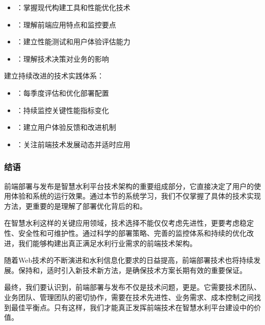 \begin{itemize}
\tightlist
\item
  ：掌握现代构建工具和性能优化技术
\item
  ：理解前端应用特点和监控要点\\
\item
  ：建立性能测试和用户体验评估能力
\item
  ：理解技术决策对业务的影响
\end{itemize}


建立持续改进的技术实践体系：

\begin{itemize}
\tightlist
\item
  ：每季度评估和优化部署配置
\item
  ：持续监控关键性能指标变化
\item
  ：建立用户体验反馈和改进机制
\item
  ：关注前端技术发展动态并适时应用
\end{itemize}

\hypertarget{ux7ed3ux8bed-1}{%
\subsubsection{结语}\label{ux7ed3ux8bed-1}}

前端部署与发布是智慧水利平台技术架构的重要组成部分，它直接决定了用户的使用体验和系统的运行效果。通过本节的系统学习，我们不仅掌握了具体的技术实现方法，更重要的是理解了部署优化背后的和。

在智慧水利这样的关键应用领域，技术选择不能仅仅考虑先进性，更要考虑稳定性、安全性和可维护性。通过科学的部署策略、完善的监控体系和持续的优化改进，我们能够构建出真正满足水利行业需求的前端技术架构。

随着Web技术的不断演进和水利信息化要求的日益提高，前端部署技术也将持续发展。保持和，适时引入新技术新方法，是确保技术方案长期有效的重要保证。

最终，我们要认识到，前端部署与发布不仅是技术问题，更是。它需要技术团队、业务团队、管理团队的密切协作，需要在技术先进性、业务需求、成本控制之间找到最佳平衡点。只有这样，我们才能真正发挥前端技术在智慧水利平台建设中的价值。